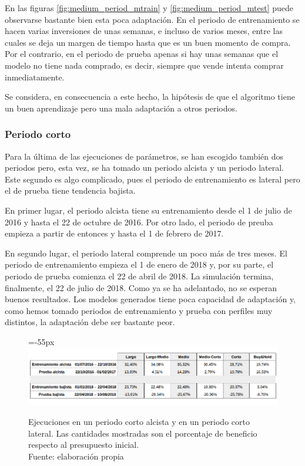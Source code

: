 En las figuras \ref{fig:medium_period_mtrain} y \ref{fig:medium_period_mtest} puede observarse bastante bien esta poca adaptaci\'on. En el periodo de entrenamiento se hacen varias inversiones de unas semanas, e incluso de varios meses, entre las cuales se deja un margen de tiempo hasta que es un buen momento de compra. Por el contrario, en el periodo de prueba apenas si hay unas semanas que el modelo no tiene nada comprado, es decir, siempre que vende intenta comprar inmediatamente.

Se considera, en consecuencia a este hecho, la hip\'otesis de que el algoritmo tiene un buen aprendizaje pero una mala adaptaci\'on a otros periodos.

     	
\subsubsection{Periodo corto}

Para la \'ultima de las ejecuciones de par\'ametros, se han escogido tambi\'en dos periodos pero, esta vez, se ha tomado un periodo alcista y un periodo lateral. Este segundo es algo complicado, pues el periodo de entrenamiento es lateral pero el de prueba tiene tendencia bajista. 

En primer lugar, el periodo alcista tiene su entrenamiento desde el 1 de julio de 2016 y hasta el 22 de octubre de 2016. Por otro lado, el periodo de preuba empieza a partir de entonces y hasta el 1 de febrero de 2017.

En segundo lugar, el periodo lateral comprende un poco m\'as de tres meses. El periodo de entrenamiento empieza el 1 de enero de 2018 y, por su parte, el periodo de prueba comienza el 22 de abril de 2018. La simulaci\'on termina, finalmente, el 22 de julio de 2018. Como ya se ha adelantado, no se esperan buenos resultados. Los modelos generados tiene poca capacidad de adaptaci\'on y, como hemos tomado periodos de entrenamiento y prueba con perfiles muy distintos, la adaptaci\'on debe ser bastante peor.

     	\begin{figure}[H]
     		\centering\leftskip=-55px
     		\includegraphics[scale=0.60]{imagenes/Short_period.png}
     		\caption[Ejecuciones en un periodo corto alcista y en un periodo corto lateral]{Ejecuciones en un periodo corto alcista y en un periodo corto lateral. Las cantidades mostradas son el porcentaje de beneficio respecto al presupuesto inicial.\\ Fuente: elaboraci\'on propia}
     		\label{fig:short_period}
     	\end{figure}

